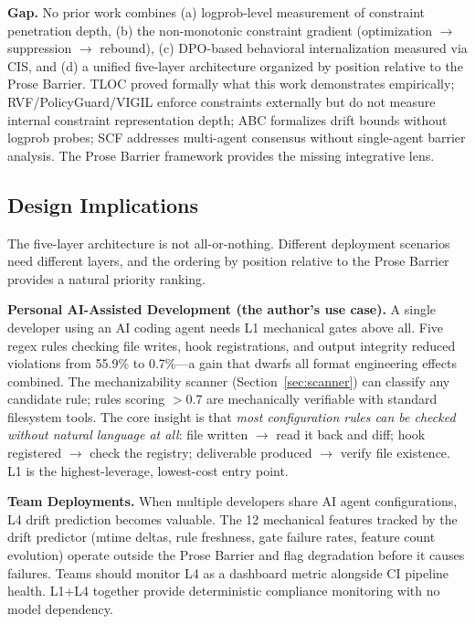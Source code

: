 \documentclass[11pt]{article}
\begin{document}
\textbf{Gap.} No prior work combines (a) logprob-level measurement of constraint
penetration depth, (b) the non-monotonic constraint gradient (optimization
$\to$ suppression $\to$ rebound), (c) DPO-based behavioral internalization
measured via CIS, and (d) a unified five-layer architecture organized by position
relative to the Prose Barrier. TLOC proved formally what this work demonstrates
empirically; RVF/PolicyGuard/VIGIL enforce constraints externally but do not
measure internal constraint representation depth; ABC formalizes drift bounds
without logprob probes; SCF addresses multi-agent consensus without single-agent
barrier analysis. The Prose Barrier framework provides the missing integrative
lens.

\subsection{Design Implications}
\label{sec:design-implications}

The five-layer architecture is not all-or-nothing. Different deployment scenarios
need different layers, and the ordering by position relative to the Prose Barrier
provides a natural priority ranking.

\textbf{Personal AI-Assisted Development (the author's use case).}
A single developer using an AI coding agent needs L1 mechanical gates above all.
Five regex rules checking file writes, hook registrations, and output integrity
reduced violations from 55.9\% to 0.7\%---a gain that dwarfs all format
engineering effects combined. The mechanizability scanner
(Section~\ref{sec:scanner}) can classify any candidate rule; rules scoring
$>$0.7 are mechanically verifiable with standard filesystem tools. The core
insight is that \textit{most configuration rules can be checked without natural
language at all}: file written $\to$ read it back and diff; hook registered
$\to$ check the registry; deliverable produced $\to$ verify file existence.
L1 is the highest-leverage, lowest-cost entry point.

\textbf{Team Deployments.} When multiple developers share AI agent
configurations, L4 drift prediction becomes valuable. The 12 mechanical features
tracked by the drift predictor (mtime deltas, rule freshness, gate failure
rates, feature count evolution) operate outside the Prose Barrier and flag
degradation before it causes failures. Teams should monitor L4 as a dashboard
metric alongside CI pipeline health. L1+L4 together provide deterministic
compliance monitoring with no model dependency.
\end{document}
